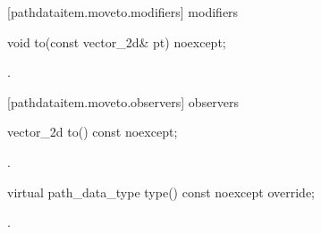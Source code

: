  [pathdataitem.moveto.modifiers]{ modifiers}

\begin{itemdecl}
    void to(const vector_2d& pt) noexcept;
\end{itemdecl}
\begin{itemdescr}
	\pnum
	\postconditions
	.
\end{itemdescr}

 [pathdataitem.moveto.observers]{ observers}

\begin{itemdecl}
    vector_2d to() const noexcept;
\end{itemdecl}
\begin{itemdescr}
	\pnum
	\returns
	.
\end{itemdescr}

\begin{itemdecl}
    virtual path_data_type type() const noexcept override;
\end{itemdecl}
\begin{itemdescr}
	\pnum
	\returns
	.
\end{itemdescr}
